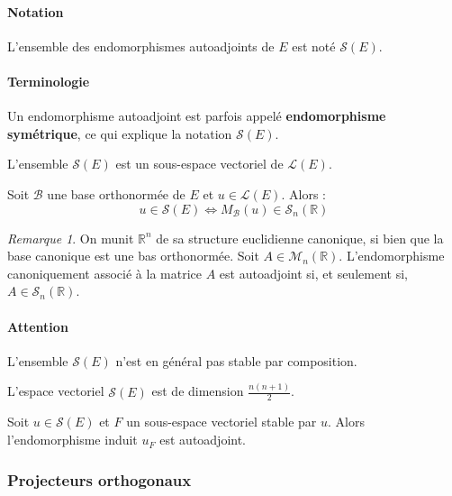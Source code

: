 \documentclass[french]{article}
\newcommand{\R}{\mathbb{R}}
\theoremstyle{plain}
\theoremstyle{definition}
\theoremstyle{remark}
\newtheorem*{rmq}{Remarque}
\begin{document}
\paragraph{Notation} L'ensemble des endomorphismes autoadjoints de $E$ est noté $\mathcal{S}(E)$.

\paragraph{Terminologie} Un endomorphisme autoadjoint est parfois appelé \textbf{endomorphisme symétrique}, ce qui explique la notation $\mathcal{S}(E)$.

\begin{thm}{}
	L'ensemble $\mathcal{S}(E)$ est un sous-espace vectoriel de $\mathcal{L}(E)$.
\end{thm}

\begin{thm}{}
	Soit $\mathcal{B}$ une base orthonormée de $E$ et $u\in\mathcal{L}(E)$. Alors : $$u\in \mathcal{S}(E)\iff M_\mathcal{B}(u)\in\mathcal{S}_n(\R)$$
\end{thm}

\begin{rmq}
	On munit $\R^n$ de sa structure euclidienne canonique, si bien que la base canonique est une bas orthonormée. Soit $A\in\mathcal{M}_n(\R)$. L'endomorphisme canoniquement associé à la matrice $A$ est autoadjoint si, et seulement si, $A\in\mathcal{S}_n(\R)$.
\end{rmq}

\paragraph{Attention} L'ensemble $\mathcal{S}(E)$ n'est en général pas stable par composition.

\begin{thm}{}
	L'espace vectoriel $\mathcal{S}(E)$ est de dimension $\displaystyle\frac{n(n+1)}{2}$.
\end{thm}

\begin{thm}{}
	Soit $u\in\mathcal{S}(E)$ et $F$ un sous-espace vectoriel stable par $u$. Alors l'endomorphisme induit $u_F$ est autoadjoint.
\end{thm}

\subsubsection*{Projecteurs orthogonaux}
\end{document}
